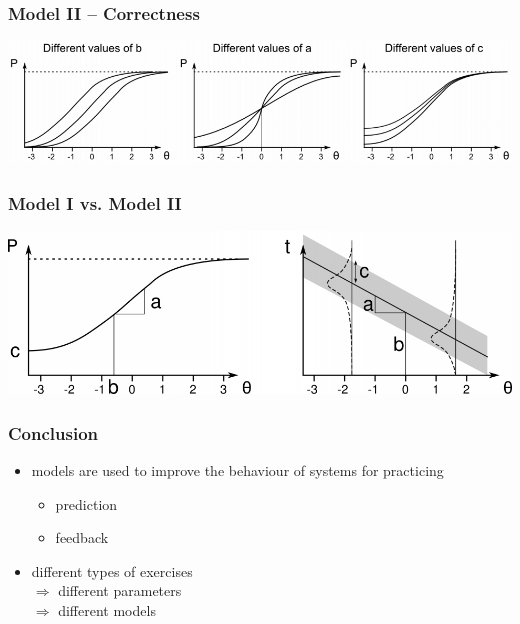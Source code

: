 \documentclass[xcolor=svgnames]{beamer}
\begin{document}
\begin{frame}
	\frametitle{Model II -- Correctness}

	\begin{center}
		\includegraphics[width=.95\textwidth]{imgs/correctness-model-types.png}
	\end{center}
\end{frame}
\begin{frame}
	\frametitle{Model I vs. Model II}

	\begin{center}
		\includegraphics[width=.95\textwidth]{imgs/models-compare.png}
	\end{center}
\end{frame}
\begin{frame}
	\frametitle{Conclusion}
	\begin{itemize}
		\item 	models are used to improve the behaviour of systems for practicing
			\begin{itemize}
				\item 	prediction
				\item 	feedback
			\end{itemize}
		\item 	different types of exercises \\
						$\Rightarrow$ different parameters \\
						$\Rightarrow$ different models
	\end{itemize}
\end{frame}
\end{document}
